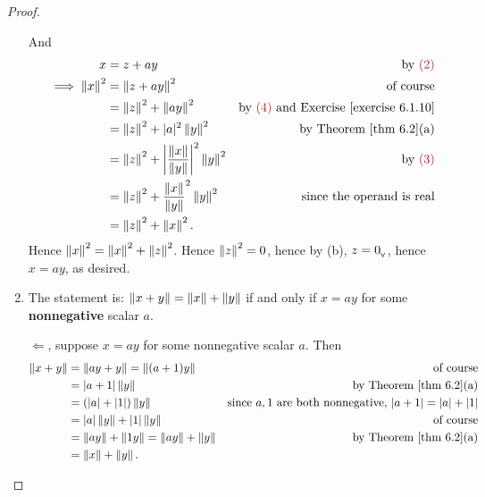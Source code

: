 \begin{proof}
\begin{enumerate}
And
\begin{align*}
    x & = z + ay & \text{by \MAROON{(2)}} \\
    \implies \norm{x}^2 & = \norm{z + ay}^2 & \text{of course} \\
        & = \norm{z}^2 + \norm{ay}^2& \text{by \MAROON{(4)} and \EXEC{6.1.10}} \\
        & = \norm{z}^2 + \abs{a}^2 \norm{y}^2 & \text{by \THM{6.2}(a)} \\
        & = \norm{z}^2 + \left| \frac{\norm{x}}{\norm{y}} \right|^2 \norm{y}^2 & \text{by \MAROON{(3)}} \\
        & = \norm{z}^2 + \frac{\norm{x}}{\norm{y}}^2 \norm{y}^2 & \text{since the operand is real} \\
        & = \norm{z}^2 + \norm{x}^2.
\end{align*}
Hence \(\left\lVert x\right\rVert^2 = \left\lVert x\right\rVert^2 + \left\lVert z\right\rVert^2\).
Hence \(\left\lVert z\right\rVert^2 = 0\), hence by (b), \(z = 0_{_{\textsf{V}}}\), hence \(x = ay\), as desired.

\item The statement is: \(\left\lVert x + y\right\rVert = \left\lVert x\right\rVert + \left\lVert y\right\rVert\) if and only if \(x = ay\) for some \textbf{nonnegative} scalar \(a\).

\(\Longleftarrow\), suppose \(x = ay\) for some nonnegative scalar \(a\).
Then
\begin{align*}
    \norm{x + y} & = \norm{ay + y} = \norm{(a + 1)y} & \text{of course} \\
        & = \abs{a + 1}\norm{y} & \text{by \THM{6.2}(a)} \\
        & = (\abs{a} + \abs{1})\norm{y} & \text{since \(a, 1\) are both nonnegative, \(\abs{a + 1} = \abs{a} + \abs{1}\)} \\
        & = \abs{a}\norm{y} + \abs{1}\norm{y} & \text{of course} \\
        & = \norm{ay} + \norm{1y} = \norm{ay} + \norm{y} & \text{by \THM{6.2}(a)} \\
        & = \norm{x} + \norm{y}.
\end{align*}


\end{enumerate}
\end{proof}
